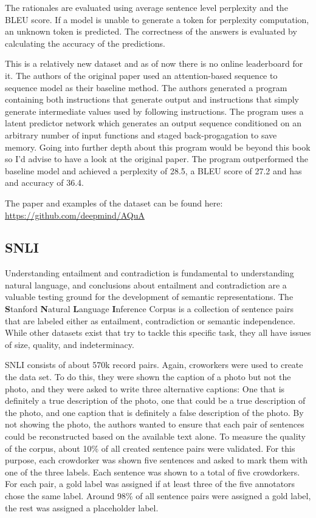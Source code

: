 \documentclass[]{krantz}
\begin{document}
The rationales are evaluated using average sentence level perplexity and the BLEU score. If a model is unable to generate a token for perplexity computation, an unknown token is predicted. The correctness of the answers is evaluated by calculating the accuracy of the predictions.

This is a relatively new dataset and as of now there is no online leaderboard for it. The authors of the original paper used an attention-based sequence to sequence model as their baseline method. The authors generated a program containing both instructions that generate output and instructions that simply generate intermediate values used by following instructions. The program uses a latent predictor network which generates an output sequence conditioned on an arbitrary number of input functions and staged back-progagation to save memory. Going into further depth about this program would be beyond this book so I'd advise to have a look at the original paper.
The program outperformed the baseline model and achieved a perplexity of 28.5, a BLEU score of 27.2 and has and accuracy of 36.4. \citep{ling2017program}

The paper and examples of the dataset can be found here:
\center \url{https://github.com/deepmind/AQuA}

\flushleft

\hypertarget{snli}{%
\subsection{SNLI}\label{snli}}

Understanding entailment and contradiction is fundamental to understanding natural language, and conclusions about entailment and contradiction are a valuable testing ground for the development of semantic representations. The \textbf{S}tanford \textbf{N}atural \textbf{L}anguage \textbf{I}nference Corpus is a collection of sentence pairs that are labeled either as entailment, contradiction or semantic independence. While other datasets exist that try to tackle this specific task, they all have issues of size, quality, and indeterminacy.

SNLI consists of about 570k record pairs. Again, croworkers were used to create the data set. To do this, they were shown the caption of a photo but not the photo, and they were asked to write three alternative captions: One that is definitely a true description of the photo, one that could be a true description of the photo, and one caption that is definitely a false description of the photo. By not showing the photo, the authors wanted to ensure that each pair of sentences could be reconstructed based on the available text alone.
To measure the quality of the corpus, about 10\% of all created sentence pairs were validated. For this purpose, each crowdorker was shown five sentences and asked to mark them with one of the three labels. Each sentence was shown to a total of five crowdorkers. For each pair, a gold label was assigned if at least three of the five annotators chose the same label. Around 98\% of all sentence pairs were assigned a gold label, the rest was assigned a placeholder label.\citep{bowman2015large}
\end{document}

